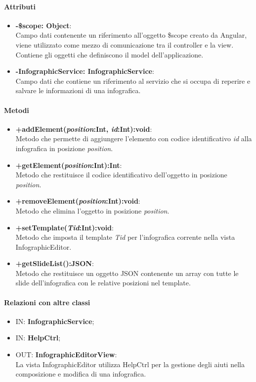 	\paragraph{Attributi}
	\begin{itemize}
		\item \textbf{-\$scope: Object}:\\
			Campo dati contenente un riferimento all'oggetto \$scope creato da Angular, viene utilizzato come mezzo di comunicazione tra il controller e la view. Contiene gli oggetti che definiscono il model dell'applicazione.
		\item \textbf{-InfographicService: InfographicService}:\\
			Campo dati che contiene un riferimento al servizio che si occupa di reperire e salvare le informazioni di una infografica.
	\end{itemize}
	
	\paragraph{Metodi}
	\begin{itemize}
	  \item \textbf{+addElement(\textit{position}:Int, \textit{id}:Int):void}:\\
		  Metodo che permette di aggiungere l'elemento con codice identificativo \textit{id} alla infografica in posizione \textit{position}.
	  \item \textbf{+getElement(\textit{position}:Int):Int}:\\
		  Metodo che restituisce il codice identificativo dell'oggetto in posizione \textit{position}.
	  \item \textbf{+removeElement(\textit{position}:Int):void}:\\
		  Metodo che elimina l'oggetto in posizione \textit{position}.
	  \item \textbf{+setTemplate(\textit{Tid}:Int):void}:\\
		  Metodo che imposta il template \textit{Tid} per l'infografica corrente nella vista InfographicEditor.
	  \item \textbf{+getSlideList():JSON}:\\
		  Metodo che restituisce un oggetto JSON contenente un array con tutte le slide dell'infografica con le relative posizioni nel template.
		  
	\end{itemize}
	\paragraph{Relazioni con altre classi}
	\begin{itemize}
		\item IN: \textbf{InfographicService};
		\item IN: \textbf{HelpCtrl};
		\item OUT: \textbf{InfographicEditorView}:\\
			La vista InfographicEditor utilizza HelpCtrl per la gestione degli aiuti nella composizione e modifica di una infografica. 	
	\end{itemize}
	
